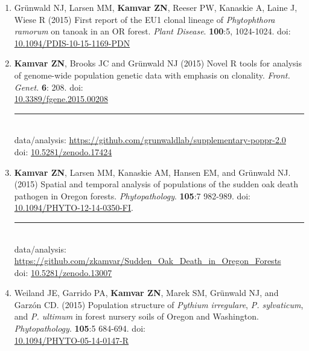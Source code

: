 \begin{enumerate}[leftmargin = 14pt]
	\vspace{3pt}

	\item Gr\"unwald NJ, Larsen MM, \textbf{Kamvar ZN}, Reeser PW, Kanaskie A,
	Laine J, Wiese R (2015) First report of the EU1 clonal lineage of
	\textit{Phytophthora ramorum} on tanoak in an OR forest.
	\textit{Plant Disease}. \textbf{100}:5, 1024-1024. doi:
	\href{http://doi.org/10.1094/PDIS-10-15-1169-PDN}{10.1094/PDIS-10-15-1169-PDN}

	\vspace{3pt}

	\item \textbf{Kamvar ZN}, Brooks JC and Gr\"unwald NJ (2015) Novel R tools for
	analysis of genome-wide population genetic data with emphasis on clonality.
	\textit{Front. Genet.} \textbf{6}: 208. doi: \\
	\href{http://doi.org/10.3389/fgene.2015.00208}{10.3389/fgene.2015.00208}\\
	\rule[0.25\baselineskip]{0.25\textwidth}{0.5pt}\\
	data/analysis:
	\href{https://github.com/grunwaldlab/supplementary-poppr-2.0#readme}{https://github.com/grunwaldlab/supplementary-poppr-2.0}\\
	doi:\phantom{t/analysis:}
	\href{https://doi.org/10.5281/zenodo.17424}{10.5281/zenodo.17424}

	\vspace{3pt}

	\item \textbf{Kamvar ZN}, Larsen MM, Kanaskie AM, Hansen EM, and Gr\"unwald
	NJ. (2015) Spatial and temporal analysis of populations of the sudden oak
	death pathogen in Oregon forests. \textit{Phytopathology}. \textbf{105}:7
	982-989. doi:
	\href{http://doi.org/10.1094/PHYTO-12-14-0350-FI}{10.1094/PHYTO-12-14-0350-FI}.\\
	\rule[0.25\baselineskip]{0.25\textwidth}{0.5pt}\\
	data/analysis:
	\href{https://github.com/zkamvar/Sudden_Oak_Death_in_Oregon_Forests#readme}{https://github.com/zkamvar/Sudden\_Oak\_Death\_in\_Oregon\_Forests}\\
	doi:\phantom{t/analysis:}
	\href{https://doi.org/10.5281/zenodo.13007}{10.5281/zenodo.13007}

	\vspace{3pt}

	\item Weiland JE, Garrido PA, \textbf{Kamvar ZN}, Marek SM, Gr\"unwald NJ, and
	Garz\'on CD. (2015) Population structure of \textit{Pythium irregulare}, \textit{P.
	sylvaticum}, and \textit{P. ultimum} in forest nursery soils of Oregon and
	Washington. \textit{Phytopathology}. \textbf{105}:5 684-694. doi: \\
	\href{http://doi.org/10.1094/PHYTO-05-14-0147-R}{10.1094/PHYTO-05-14-0147-R}


\end{enumerate}
